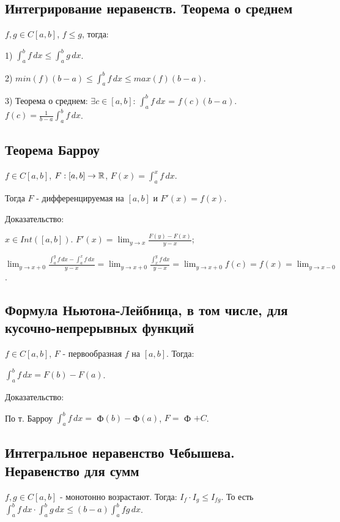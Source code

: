\documentclass[../main.tex]{subfiles}
\begin{document}
\subsection{Интегрирование неравенств. Теорема о среднем}

$f, g \in C[a, b]$, $f \leq g$, тогда:

1) $\int_{a}^{b} f\,dx \leq \int_{a}^{b} g\,dx $.

2) $min(f) (b - a) \leq \int_{a}^{b} f\,dx \leq max(f) (b - a)$.

3) Теорема о среднем: $\exists c \in [a, b]$: $\int_{a}^{b} f\,dx$ = $f(c) (b - a)$. $f(c) = \frac{1}{b-a} \int_{a}^{b} f \,dx$.

\newpage


\subsection{Теорема Барроу}

$f \in C[a, b]$, $F: [a, b] \to \mathbb{R}$, $F(x) = \int_{a}^{x} f \,dx$.

Тогда $F$ - дифференцируемая на $[a, b]$ и $F'(x) = f(x)$.

Доказательство:

$x \in Int([a, b])$. $F'(x) = \lim_{y \to x} \frac{F(y) - F(x)}{y - x}$;

$\lim_{y \to x + 0} \frac{\int_{a}^{y} f \,dx - \int_{a}^{x} f \,dx}{y - x} = \lim_{y \to x + 0} \frac{\int_{x}^{y} f \,dx}{y - x} = \lim_{y \to x + 0} f(c) = f(x) = \lim_{y \to x - 0}$.

\newpage


\subsection{Формула Ньютона-Лейбница, в том числе, для кусочно-непрерывных функций}

$f \in C[a, b]$, $F$ - первообразная $f$ на $[a, b]$. Тогда:

$\int_{a}^{b} f \,dx = F(b) - F(a)$.

Доказательство:

По т. Барроу $\int_{a}^{b} f \,dx = $ Ф$(b) - $Ф$(a)$, $F =$ Ф $+ C$.

\newpage


\subsection{Интегральное неравенство Чебышева. Неравенство для сумм}

$f, g \in C[a, b]$ - монотонно возрастают. Тогда: $I_f \cdot I_g \leq I_{fg}$. То есть $\int_{a}^{b} f \,dx \cdot \int_{a}^{b} g \,dx \leq (b - a) \int_{a}^{b} fg \,dx$.
\end{document}
